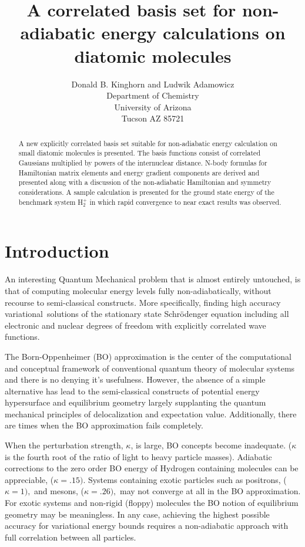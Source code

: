 \documentclass[12pt]{article}
\begin{document}
\title{A correlated basis set for non-adiabatic energy calculations on diatomic molecules}
\author{Donald B. Kinghorn and Ludwik Adamowicz\\Department of Chemistry\\University of Arizona\\Tucson AZ 85721}
\maketitle
\begin{abstract}
A new explicitly correlated basis set suitable for non-adiabatic energy
calculation on small diatomic molecules is presented. The basis functions
consist of correlated Gaussians multiplied by powers of the internuclear
distance. N-body formulas for Hamiltonian matrix elements and energy gradient
components are derived and presented along with a discussion of the
non-adiabatic Hamiltonian and symmetry considerations. A sample calculation is
presented for the ground state energy of the benchmark system H$_{2}^{+}$ in
which rapid convergence to near exact results was observed.
\end{abstract}



\section{Introduction}

An interesting Quantum Mechanical problem that is almost entirely untouched,
is that of computing molecular energy levels fully non-adiabatically, without
recourse to semi-classical constructs\textit{.} More specifically, finding
high accuracy variational\ solutions of the stationary state Schr\"{o}denger
equation including all electronic and nuclear degrees of freedom with
explicitly correlated wave functions.

The Born-Oppenheimer (BO) approximation is the center of the computational and
conceptual framework of conventional quantum theory of molecular systems and
there is no denying it's usefulness. However, the absence of a simple
alternative has lead to the semi-classical constructs of potential energy
hypersurface and equilibrium geometry largely supplanting the quantum
mechanical principles of delocalization and expectation value. Additionally,
there are times when the BO approximation fails completely.

When the perturbation strength, $\kappa$, is large, BO concepts become
inadequate. ($\kappa$ is the fourth root of the ratio of light to heavy
particle masses). Adiabatic corrections to the zero order BO energy of
Hydrogen containing molecules can be appreciable, ($\kappa=.15)$. Systems
containing exotic particles such as positrons, ($\kappa=1),$ and mesons,
($\kappa=.26),$ may not converge at all in the BO approximation. For exotic
systems and non-rigid (floppy) molecules the BO notion of equilibrium geometry
may be meaningless. In any case, achieving the highest possible accuracy for
variational energy bounds requires a non-adiabatic approach with full
correlation between all particles.
\end{document}
